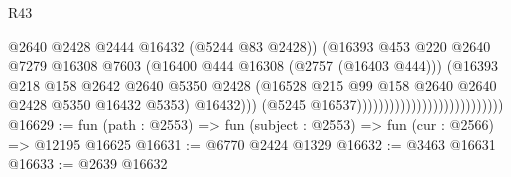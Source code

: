 \begin{lexlean}{R43}
\begin{coremodule}
                                                            @2640
                                                            @2428
                                                            @2444
                                                            @16432
                                                            (@5244 @83 @2428))
                                                          (@16393
                                                            @453
                                                            @220
                                                            @2640
                                                            @7279
                                                            @16308
                                                            @7603
                                                            (@16400
                                                              @444
                                                              @16308
                                                              (@2757 (@16403 @444)))
                                                            (@16393
                                                              @218
                                                              @158
                                                              @2642
                                                              @2640
                                                              @5350
                                                              @2428
                                                              (@16528
                                                                @215
                                                                @99
                                                                @158
                                                                @2640
                                                                @2640
                                                                @2428
                                                                @5350
                                                                @16432
                                                                @5353)
                                                              @16432)))
                                                        (@5245 @16537)))))))))))))))))))))))))))
@16629 := fun (path : @2553) => fun (subject : @2553) => fun (cur : @2566) => @12195 @16625
@16631 := @6770 @2424 @1329
@16632 := @3463 @16631
@16633 := @2639 @16632

\end{coremodule}
\end{lexlean}
